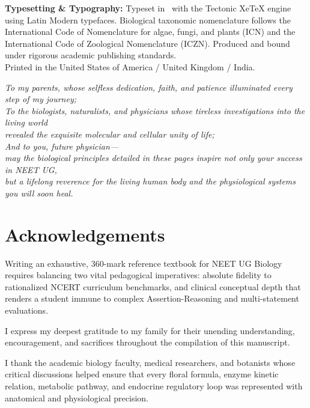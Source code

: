 \documentclass[10pt,twoside,openright]{book}
\begin{document}
\begin{flushleft}
{\textbf{Typesetting \& Typography:} Typeset in \LaTeXe\ with the Tectonic XeTeX engine using Latin Modern typefaces. Biological taxonomic nomenclature follows the International Code of Nomenclature for algae, fungi, and plants (ICN) and the International Code of Zoological Nomenclature (ICZN). Produced and bound under rigorous academic publishing standards.\\[4pt]
Printed in the United States of America / United Kingdom / India.
}
\end{flushleft}
\cleardoublepage

\thispagestyle{empty}
\vspace*{5cm}
\begin{center}
  \itshape\large
  To my parents, whose selfless dedication, faith, and patience illuminated every step of my journey;\\
  \vspace{1.2cm}
  To the biologists, naturalists, and physicians whose tireless investigations into the living world\\
  revealed the exquisite molecular and cellular unity of life;\\
  \vspace{1.2cm}
  And to you, future physician---\\
  may the biological principles detailed in these pages inspire not only your success in NEET UG,\\
  but a lifelong reverence for the living human body and the physiological systems you will soon heal.
\end{center}
\cleardoublepage

\chapter*{Acknowledgements}

Writing an exhaustive, 360-mark reference textbook for NEET UG Biology requires balancing two vital pedagogical imperatives: absolute fidelity to rationalized NCERT curriculum benchmarks, and clinical conceptual depth that renders a student immune to complex Assertion-Reasoning and multi-statement evaluations.

I express my deepest gratitude to my family for their unending understanding, encouragement, and sacrifices throughout the compilation of this manuscript.

I thank the academic biology faculty, medical researchers, and botanists whose critical discussions helped ensure that every floral formula, enzyme kinetic relation, metabolic pathway, and endocrine regulatory loop was represented with anatomical and physiological precision.
\end{document}
